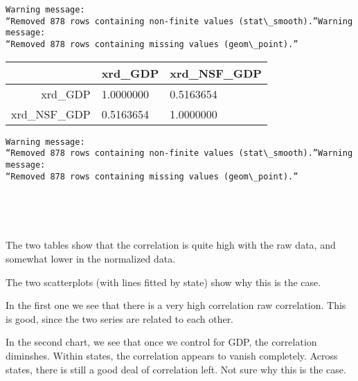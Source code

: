 \documentclass[11pt]{article}
\begin{document}
    
    \begin{Verbatim}[commandchars=\\\{\}]
Warning message:
“Removed 878 rows containing non-finite values (stat\_smooth).”Warning message:
“Removed 878 rows containing missing values (geom\_point).”
    \end{Verbatim}

    
    
    \begin{tabular}{r|ll}
  & xrd\_GDP & xrd\_NSF\_GDP\\
\hline
	xrd\_GDP & 1.0000000 & 0.5163654\\
	xrd\_NSF\_GDP & 0.5163654 & 1.0000000\\
\end{tabular}


    
    \begin{Verbatim}[commandchars=\\\{\}]
Warning message:
“Removed 878 rows containing non-finite values (stat\_smooth).”Warning message:
“Removed 878 rows containing missing values (geom\_point).”
    \end{Verbatim}

    
    
    \begin{center}
    \end{center}
    { \hspace*{\fill} \\}
    
    \begin{center}
    \end{center}
    { \hspace*{\fill} \\}
    
    The two tables show that the correlation is quite high with the raw
data, and somewhat lower in the normalized data.

The two scatterplots (with lines fitted by state) show why this is the
case.

In the first one we see that there is a very high correlation raw
correlation. This is good, since the two series are related to each
other.

In the second chart, we see that once we control for GDP, the
correlation diminshes. Within states, the correlation appears to vanish
completely. Across states, there is still a good deal of correlation
left. Not sure why this is the case.
\end{document}
